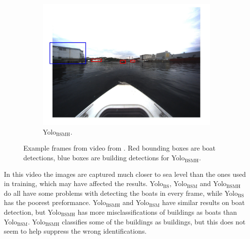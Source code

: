 \begin{figure}[h!]
\begin{subfigure}[b]{0.6\textwidth}
   \includegraphics[width=1\linewidth]{results/kamsvag/yolo3_figure_1479.jpg}
   \caption{Yolo$_{\text{BSMH}}$.}
\end{subfigure}
\caption{Example frames from video from \citep{Kamsvag2018}. Red bounding boxes are boat detections, blue boxes are building detections for Yolo$_{\text{BSMH}}$.}
\label{fig:kamsvaag_vid}
\end{figure}

\noindent
In this video the images are captured much closer to sea level than the ones used in training, which may have affected the results. Yolo$_{\text{BS}}$, Yolo$_{\text{BSM}}$ and Yolo$_{\text{BSMH}}$ do all have some problems with detecting the boats in every frame, while Yolo$_{\text{BS}}$ has the poorest preformance. Yolo$_{\text{BSMH}}$ and Yolo$_{\text{BSM}}$ have similar results on boat detection, but Yolo$_{\text{BSMH}}$ has more misclassifications of buildings as boats than Yolo$_{\text{BSM}}$. Yolo$_{\text{BSMH}}$ classifies some of the buildings as buildings, but this does not seem to help suppress the wrong identifications. 



